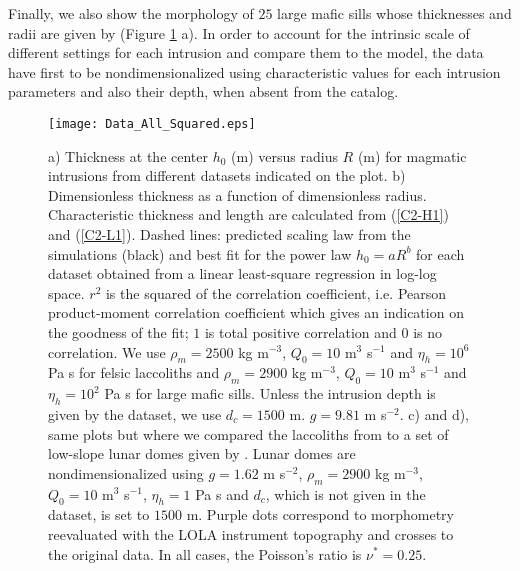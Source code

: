 Finally, we also  show the morphology of $25$ large  mafic sills whose
thicknesses  and   radii  are   given  by   \citet{Cruden:tg}  (Figure
\ref{C2-Corry_Rocchie}  a).  In  order  to account  for the  intrinsic
scale of different settings for each intrusion and compare them to the
model,   the  data   have   first  to   be  nondimensionalized   using
characteristic  values for  each intrusion  parameters and  also their
depth, when absent from the catalog.

\begin{figure}[htpb]
  \begin{center}
    \graphicspath{ {/Users/thorey/Documents/These/Projet/Refroidissement/Skin_Model/Figure/Figure_Data/} }
    \texttt{[image: Data\_All\_Squared.eps]}
    \caption{a) Thickness  at the center  $h_0$ (m) versus  radius $R$
      (m) for magmatic intrusions from different datasets indicated on
      the  plot.    b)  Dimensionless  thickness  as   a  function  of
      dimensionless  radius. Characteristic  thickness and  length are
      calculated from (\ref{C2-H1})  and (\ref{C2-L1}).  Dashed lines:
      predicted scaling law from the  simulations (black) and best fit
      for the  power law $h_0=aR^b$  for each dataset obtained  from a
      linear least-square  regression in log-log space.   $r^2$ is the
      squared   of   the   correlation  coefficient,   i.e.    Pearson
      product-moment correlation coefficient which gives an indication
      on the  goodness of the  fit; $1$ is total  positive correlation
      and $0$  is no correlation.   We use $\rho_m=2500$  kg m$^{-3}$,
      $Q_0  =10$ m$^3$  s$^{-1}$  and $\eta_h=10^6$  Pa  s for  felsic
      laccoliths  and  $\rho_m=2900$  kg  m$^{-3}$,  $Q_0  =10$  m$^3$
      s$^{-1}$ and $\eta_h=10^2$  Pa s for large  mafic sills.  Unless
      the intrusion depth  is given by the dataset,  we use $d_c=1500$
      m.  $g=9.81$  m s$^{-2}$.  c)  and d),  same plots but  where we
      compared the  laccoliths from \citet{Rocchi:2002jy} to  a set of
      low-slope  lunar domes  given  by \citet{Wohler:2009jj}.   Lunar
      domes   are  nondimensionalized   using  $g=1.62$   m  s$^{-2}$,
      $\rho_m=2900$ kg m$^{-3}$, $Q_0  =10$ m$^3$ s$^{-1}$, $\eta_h=1$
      Pa s  and $d_c$, which  is not given in  the dataset, is  set to
      $1500$ m. Purple dots correspond to morphometry reevaluated with
      the  LOLA  instrument topography  and  crosses  to the  original
      data. In all cases, the Poisson's ratio is $\nu^*=0.25$.}
    \label{C2-Corry_Rocchie}
  \end{center}
\end{figure}

